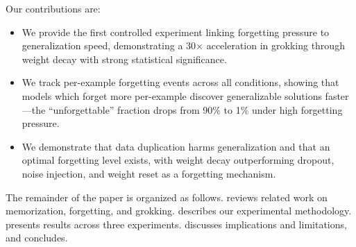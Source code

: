 Our contributions are:
\begin{itemize}[leftmargin=*,itemsep=0pt,topsep=0pt]
    \item We provide the first controlled experiment linking forgetting pressure to generalization speed, demonstrating a 30$\times$ acceleration in grokking through weight decay with strong statistical significance.
    \item We track per-example forgetting events across all conditions, showing that models which forget more per-example discover generalizable solutions faster---the ``unforgettable'' fraction drops from 90\% to 1\% under high forgetting pressure.
    \item We demonstrate that data duplication harms generalization and that an optimal forgetting level exists, with weight decay outperforming dropout, noise injection, and weight reset as a forgetting mechanism.
\end{itemize}

The remainder of the paper is organized as follows.  reviews related work on memorization, forgetting, and grokking.  describes our experimental methodology.  presents results across three experiments.  discusses implications and limitations, and  concludes.
